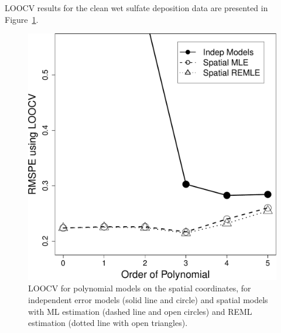 \documentclass[12pt, titlepage]{article}
\begin{document}
LOOCV results for the clean wet sulfate deposition data are presented in Figure~\ref{Fig:SO4_LOOCV}.
\begin{figure}[h]
  \begin{center}
	    \includegraphics[width=.5\linewidth]{SO4_LOOCV}
  \end{center}
  \caption{LOOCV for polynomial models on the spatial coordinates, for independent error models (solid line and circle) and spatial models with ML estimation (dashed line and open circles) and REML estimation (dotted line with open triangles). \label{Fig:SO4_LOOCV}}
\end{figure}


%


%
%
\end{document}
